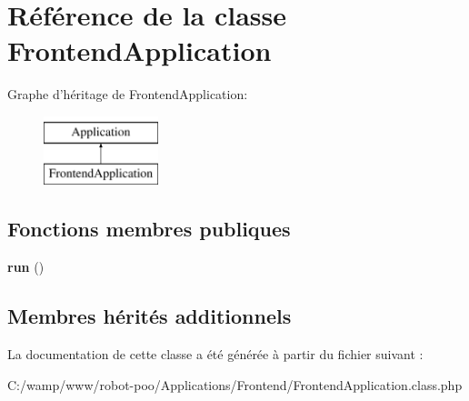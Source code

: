 \hypertarget{class_applications_1_1_frontend_1_1_frontend_application}{\section{Référence de la classe Frontend\+Application}
\label{class_applications_1_1_frontend_1_1_frontend_application}
}
Graphe d'héritage de Frontend\+Application\+:\begin{figure}[H]
\begin{center}
\leavevmode
\includegraphics[height=2.000000cm]{class_applications_1_1_frontend_1_1_frontend_application}
\end{center}
\end{figure}
\subsection*{Fonctions membres publiques}
\begin{DoxyCompactItemize}
\item 
\hypertarget{class_applications_1_1_frontend_1_1_frontend_application_afb0fafe7e02a3ae1993c01c19fad2bae}{{\bfseries run} ()}\label{class_applications_1_1_frontend_1_1_frontend_application_afb0fafe7e02a3ae1993c01c19fad2bae}

\end{DoxyCompactItemize}
\subsection*{Membres hérités additionnels}


La documentation de cette classe a été générée à partir du fichier suivant \+:\begin{DoxyCompactItemize}
\item 
C\+:/wamp/www/robot-\/poo/\+Applications/\+Frontend/Frontend\+Application.\+class.\+php\end{DoxyCompactItemize}
